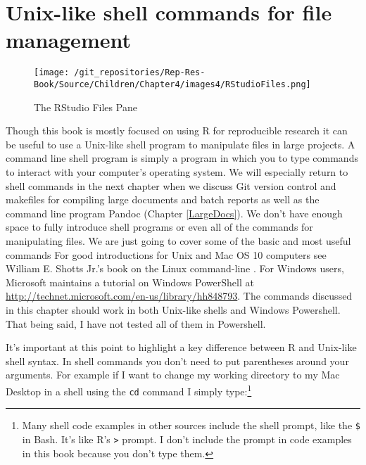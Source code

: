 \section{Unix-like shell commands for file management} 

\begin{wrapfigure}{r}{0.5\textwidth}
    \caption{The RStudio Files Pane} %
    \label{FilesPane}
        \begin{center}    
        \texttt{[image: /git\_repositories/Rep-Res-Book/Source/Children/Chapter4/images4/RStudioFiles.png]}
        \end{center}
\end{wrapfigure}

Though this book is mostly focused on using R for reproducible research it can be useful to use a Unix-like shell program to manipulate files in large projects. A command line shell program is simply a program in which you to type commands to interact with your computer's operating system. We will especially return to shell commands in the next chapter when we discuss Git version control and makefiles for compiling large documents and batch reports as well as the command line program Pandoc (Chapter \ref{LargeDocs}). We don't have enough space to fully introduce shell programs or even all of the commands for manipulating files. We are just going to cover some of the basic and most useful commands For good introductions for Unix and Mac OS 10 computers see William E. Shotts Jr.'s book on the Linux command-line \cite[]{ShottsJr2012}. For Windows users, Microsoft maintains a tutorial on Windows PowerShell at \url{http://technet.microsoft.com/en-us/library/hh848793}. The commands discussed in this chapter should work in both Unix-like shells and Windows Powershell. That being said, I have not tested all of them in Powershell. 

It's important at this point to highlight a key difference between R and Unix-like shell syntax. In shell commands you don't need to put parentheses around your arguments. For example if I want to change my working directory to my Mac Desktop in a shell using the \texttt{cd} command I simply type:\footnote{Many shell code examples in other sources include the shell prompt, like the \texttt{\$} in Bash. It's like R's \texttt{\textgreater} prompt. I don't include the prompt in code examples in this book because you don't type them.}


